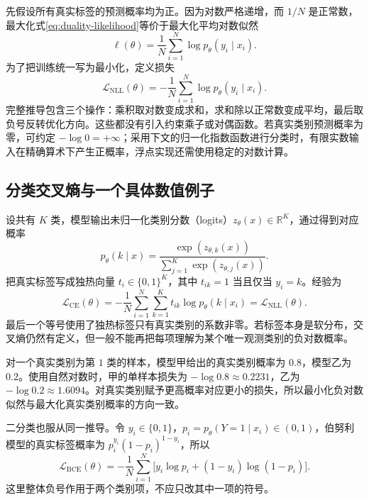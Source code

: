 \documentclass[UTF8]{ctexart}
\begin{document}
先假设所有真实标签的预测概率均为正。因为对数严格递增，而 $1/N$ 是正常数，最大化式\eqref{eq:duality-likelihood}等价于最大化平均对数似然
\[
 \ell(\theta)=\frac1N\sum_{i=1}^N\log p_\theta(y_i\mid x_i).
\]
为了把训练统一写为最小化，定义损失
\begin{equation}
 \mathcal L_{\mathrm{NLL}}(\theta)
 =-\frac1N\sum_{i=1}^N\log p_\theta(y_i\mid x_i).
 \label{eq:duality-nll}
\end{equation}
完整推导包含三个操作：乘积取对数变成求和，求和除以正常数变成平均，最后取负号反转优化方向。这些都没有引入约束乘子或对偶函数。若真实类别预测概率为零，可约定 $-\log0=+\infty$；采用下文的归一化指数函数进行分类时，有限实数输入在精确算术下产生正概率，浮点实现还需使用稳定的对数计算。

\subsection{分类交叉熵与一个具体数值例子}

设共有 $K$ 类，模型输出未归一化类别分数（logits）$z_\theta(x)\in\mathbb R^K$，通过得到对应概率
\[
 p_\theta(k\mid x)
 =\frac{\exp(z_{\theta,k}(x))}{\sum_{j=1}^K\exp(z_{\theta,j}(x))}.
\]
把真实标签写成独热向量 $t_i\in\{0,1\}^K$，其中 $t_{ik}=1$ 当且仅当 $y_i=k$。经验为
\begin{equation}
 \mathcal L_{\mathrm{CE}}(\theta)
 =-\frac1N\sum_{i=1}^N\sum_{k=1}^K t_{ik}\log p_\theta(k\mid x_i)
 =\mathcal L_{\mathrm{NLL}}(\theta).
 \label{eq:duality-cross-entropy}
\end{equation}
最后一个等号使用了独热标签只有真实类别的系数非零。若标签本身是软分布，交叉熵仍然有定义，但一般不能再把每项理解为某个唯一观测类别的负对数概率。

\begin{example}[为什么负号使正确预测得到较小损失]
对一个真实类别为第 $1$ 类的样本，模型甲给出的真实类别概率为 $0.8$，模型乙为 $0.2$。使用自然对数时，甲的单样本损失为 $-\log0.8\approx0.2231$，乙为 $-\log0.2\approx1.6094$。对真实类别赋予更高概率对应更小的损失，所以最小化负对数似然与最大化真实类别概率的方向一致。
\end{example}

二分类也服从同一推导。令 $y_i\in\{0,1\}$，$p_i=p_\theta(Y=1\mid x_i)\in(0,1)$，伯努利模型的真实标签概率为 $p_i^{y_i}(1-p_i)^{1-y_i}$，所以
\[
 \mathcal L_{\mathrm{BCE}}(\theta)
 =-\frac1N\sum_{i=1}^N
 \bigl[y_i\log p_i+(1-y_i)\log(1-p_i)\bigr].
\]
这里整体负号作用于两个类别项，不应只改其中一项的符号。
\end{document}
